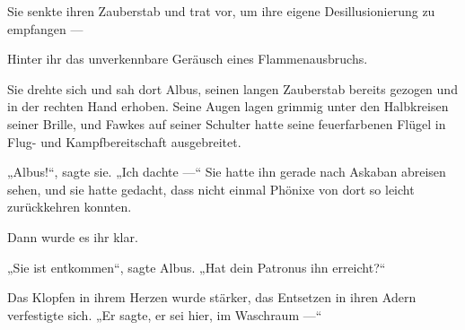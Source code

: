 Sie senkte ihren Zauberstab und trat vor, um ihre eigene Desillusionierung zu empfangen —

Hinter ihr das unverkennbare Geräusch eines Flammenausbruchs.

Sie drehte sich und sah dort Albus, seinen langen Zauberstab bereits gezogen und in der rechten Hand erhoben. Seine Augen lagen grimmig unter den Halbkreisen seiner Brille, und Fawkes auf seiner Schulter hatte seine feuerfarbenen Flügel in Flug- und Kampfbereitschaft ausgebreitet.

„Albus!“, sagte sie.
„Ich dachte —“ Sie hatte ihn gerade nach Askaban abreisen sehen, und sie hatte gedacht, dass nicht einmal Phönixe von dort so leicht zurückkehren konnten.

Dann wurde es ihr klar.

„Sie ist entkommen“, sagte Albus.
„Hat dein Patronus ihn erreicht?“

Das Klopfen in ihrem Herzen wurde stärker, das Entsetzen in ihren Adern verfestigte sich.
„Er sagte, er sei hier, im Waschraum —“

